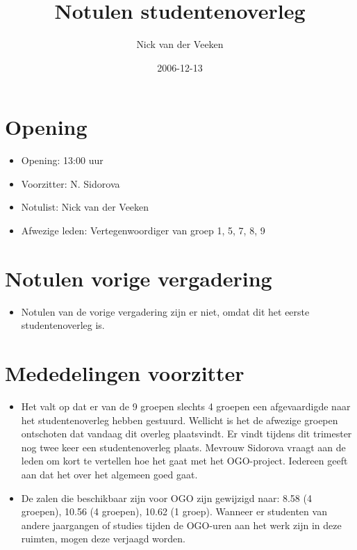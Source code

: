 \documentclass[]{article}
\title{Notulen studentenoverleg}
\author{Nick van der Veeken\\ }
\date{2006-12-13}
\begin{document}
\ifpdf
{}
\else
{}
\fi

\maketitle


\section{Opening}
  \begin{itemize}
    \item Opening: 13:00 uur
	  \item Voorzitter: N. Sidorova
	  \item Notulist: Nick van der Veeken
	  \item Afwezige leden: Vertegenwoordiger van groep 1, 5, 7, 8, 9
  \end{itemize}


\section{Notulen vorige vergadering}

  \begin{itemize}
     \item Notulen van de vorige vergadering zijn er niet, omdat dit het eerste studentenoverleg is.
  \end{itemize}

\section{Mededelingen voorzitter}

  \begin{itemize}
    \item Het valt op dat er van de 9 groepen slechts 4 groepen een afgevaardigde naar het studentenoverleg hebben gestuurd. Wellicht is het de afwezige groepen ontschoten dat vandaag dit overleg plaatsvindt. Er vindt tijdens dit trimester nog twee keer een studentenoverleg plaats. Mevrouw Sidorova vraagt aan de leden om kort te vertellen hoe het gaat met het OGO-project. Iedereen geeft aan dat het over het algemeen goed gaat.
   
    \item De zalen die beschikbaar zijn voor OGO zijn gewijzigd naar: 8.58 (4 groepen), 10.56 (4 groepen), 10.62 (1 groep). Wanneer er studenten van andere jaargangen of studies tijden de OGO-uren aan het werk zijn in deze ruimten, mogen deze verjaagd worden.
  \end{itemize}
\end{document}
